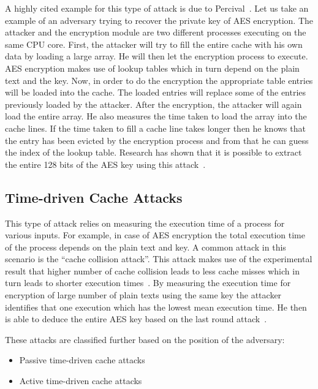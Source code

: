\documentclass[onecolumn]{IEEEtran}
\begin{document}
A highly cited example for this type of attack is due to
Percival~\cite{percival2005cache}.  Let us take an example of an
adversary trying to recover the private key of AES encryption.  The
attacker and the encryption module are two different processes
executing on the same CPU core.  First, the attacker will try to fill
the entire cache with his own data by loading a large array.  He will
then let the encryption process to execute.  AES encryption makes use
of lookup tables which in turn depend on the plain text and the key.
Now, in order to do the encryption the appropriate table entries will
be loaded into the cache.  The loaded entries will replace some of the
entries previously loaded by the attacker.  After the encryption, the
attacker will again load the entire array.  He also measures the time
taken to load the array into the cache lines.  If the time taken to
fill a cache line takes longer then he knows that the entry has been
evicted by the encryption process and from that he can guess the index
of the lookup table.  Research has shown that it is possible to
extract the entire 128 bits of the AES key using this
attack~\cite{aciiccmez2007yet,osvik2006cache}.

\subsection{Time-driven Cache Attacks}

This type of attack relies on measuring the execution time of a
process for various inputs.  For example, in case of AES encryption
the total execution time of the process depends on the plain text and
key.  A common attack in this scenario is the ``cache collision
attack''.  This attack makes use of the experimental result that
higher number of cache collision leads to less cache misses which in
turn leads to shorter execution
times~\cite{osvik2006cache,bonneau2006cache,tiri2007analytical}.  By
measuring the execution time for encryption of large number of plain
texts using the same key the attacker identifies that one execution
which has the lowest mean execution time.  He then is able to deduce
the entire AES key based on the last round
attack~\cite{bonneau2006cache,tiri2007analytical}.

These attacks are classified further based on the position of the adversary:

\begin{itemize}
\item Passive time-driven cache attacks
\item Active time-driven cache attacks
\end{itemize}
\end{document}
